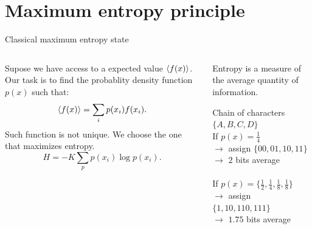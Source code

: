 \documentclass{cubeamer}
\begin{document}
\section{Maximum entropy principle}

\begin{frame}{Classical maximum entropy state}
    \begin{columns}
        \begin{column}{0.5\textwidth}
            Supose we have access to a expected value $\expval{f(x)}$. Our task is to find the probablity density function $p(x)$ such that:
            \begin{equation*}
                \expval{f(x)}=\sum_{i}p(x_{i})f(x_{i}).
            \end{equation*}
            Such function is not unique. We choose the one that maximizes entropy.
                \begin{equation*}
                    H=-K\sum_{p}p(x_{i})\log{p(x_{i})}.
                \end{equation*}
        \end{column}
        \begin{column}{0.5\textwidth}
                Entropy is a measure of the average quantity of information. \\
                \vspace{0.2cm}
                \begin{tcolorbox}
                    Chain of characters $\{A,B,C,D\}$\\
                    If $p(x)=\frac{1}{4}$\\
                    $\rightarrow$ assign $\{00, 01, 10, 11\}$\\
                    $\rightarrow$ $2$ bits average\\
                    \\
                    If $p(x)=\{\frac{1}{2},\frac{1}{4},\frac{1}{8},\frac{1}{8}\}$\\
                    $\rightarrow$ assign $\{1, 10, 110, 111\}$\\
                    $\rightarrow$ $1.75$  bits average
                \end{tcolorbox}
        \end{column}
    \end{columns}
\end{frame}
\end{document}
